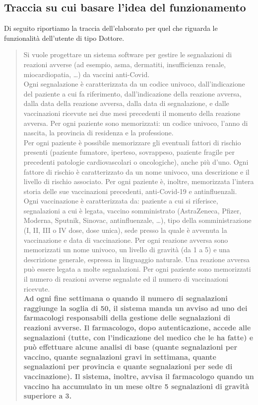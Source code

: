 \documentclass[11pt]{article}
\begin{document}
            \subsection*{Traccia su cui basare l'idea del funzionamento}
            Di seguito riportiamo la traccia dell'elaborato per quel che riguarda le funzionalità dell'utente di tipo Dottore.
            \begin{quotation}
            Si vuole progettare un sistema software per gestire le segnalazioni di reazioni avverse (ad esempio, asma, dermatiti, insufficienza renale, miocardiopatia, \dots) da vaccini anti-Covid.\\
                Ogni segnalazione è caratterizzata da un codice univoco, dall'indicazione del paziente a cui fa riferimento, dall'indicazione della reazione avversa, dalla data della reazione avversa, dalla data di segnalazione, e dalle vaccinazioni ricevute nei due mesi precedenti il momento della reazione avversa.
                Per ogni paziente sono memorizzati: un codice univoco, l'anno di nascita, la provincia di residenza e la professione.\\
                Per ogni paziente è possibile memorizzare gli eventuali fattori di rischio presenti (paziente fumatore, iperteso, sovrappeso, paziente fragile per precedenti patologie cardiovascolari o oncologiche), anche più d'uno. Ogni fattore di rischio è caratterizzato da un nome univoco, una descrizione e il livello di rischio associato. Per ogni paziente è, inoltre, memorizzata l'intera storia delle sue vaccinazioni precedenti, anti-Covid-19 e antinfluenzali.\\
                Ogni vaccinazione è caratterizzata da: paziente a cui si riferisce, segnalazioni a cui è legata, vaccino somministrato (AstraZeneca, Pfizer, Moderna, Sputnik, Sinovac, antinfluenzale, \dots), tipo della somministrazione (I, II, III o IV dose, dose unica), sede presso la quale è avvenuta la vaccinazione e data di vaccinazione. Per ogni reazione avversa sono memorizzati un nome univoco, un livello di gravità (da 1 a 5) e una descrizione generale, espressa in linguaggio naturale. Una reazione avversa può essere legata a molte segnalazioni. Per ogni paziente sono memorizzati il numero di reazioni avverse segnalate ed il numero di vaccinazioni ricevute.\\
                \textbf{Ad ogni fine settimana o quando il numero di segnalazioni raggiunge la soglia di 50, il sistema manda un avviso ad uno dei farmacologi responsabili della gestione delle segnalazioni di reazioni avverse. Il farmacologo, dopo autenticazione, accede alle segnalazioni (tutte, con l'indicazione del medico che le ha fatte) e può effettuare alcune analisi di base (quante segnalazioni per vaccino, quante segnalazioni gravi in settimana, quante segnalazioni per provincia e quante segnalazioni per sede di vaccinazione). Il sistema, inoltre, avvisa il farmacologo quando un vaccino ha accumulato in un mese oltre 5 segnalazioni di gravità superiore a 3.
}
\end{quotation}
\end{document}
